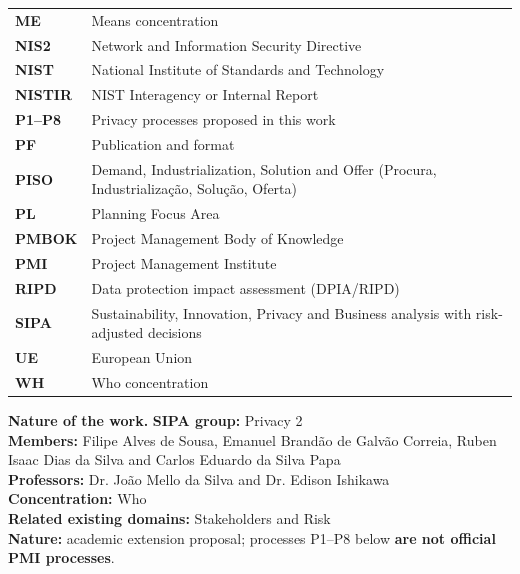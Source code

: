 \documentclass[11pt,a4paper]{article}
\newcommand{\SingleSpacing}{}
\newcommand{\onelineskip}{\baselineskip}
\begin{document}
\begin{longtable}{@{}>{\raggedright\arraybackslash}p{2.6cm}>{\raggedright\arraybackslash}p{\dimexpr\linewidth-2.6cm-2\tabcolsep\relax}@{}}
\textbf{ME} & Means concentration\\[2pt]
\textbf{NIS2} & Network and Information Security Directive\\[2pt]
\textbf{NIST} & National Institute of Standards and Technology\\[2pt]
\textbf{NISTIR} & NIST Interagency or Internal Report\\[2pt]
\textbf{P1--P8} & Privacy processes proposed in this work\\[2pt]
\textbf{PF} & Publication and format\\[2pt]
\textbf{PISO} & Demand, Industrialization, Solution and Offer (Procura, Industrialização, Solução, Oferta)\\[2pt]
\textbf{PL} & Planning Focus Area\\[2pt]
\textbf{PMBOK} & Project Management Body of Knowledge\\[2pt]
\textbf{PMI} & Project Management Institute\\[2pt]
\textbf{RIPD} & Data protection impact assessment (DPIA/RIPD)\\[2pt]
\textbf{SIPA} & Sustainability, Innovation, Privacy and Business analysis with risk-adjusted decisions\\[2pt]
\textbf{UE} & European Union\\[2pt]
\textbf{WH} & Who concentration\\[2pt]
\end{longtable}
\endgroup
\clearpage

\tableofcontents
\bigskip
\listoffigures
\bigskip
\listoftables
\clearpage
{}
\setcounter{table}{0}

\begin{flushleft}\small\SingleSpacing
\noindent\textbf{Nature of the work.} \textbf{SIPA group:} Privacy 2\\ \textbf{Members:} Filipe Alves de Sousa, Emanuel Brandão de Galvão Correia, Ruben Isaac Dias da Silva and Carlos Eduardo da Silva Papa\\ \textbf{Professors:} Dr. João Mello da Silva and Dr. Edison Ishikawa\\ \textbf{Concentration:} Who\\ \textbf{Related existing domains:} Stakeholders and Risk\\ \textbf{Nature:} academic extension proposal; processes P1–P8 below \textbf{are not official PMI processes}.
\end{flushleft}
\vspace{\onelineskip}
\end{document}
